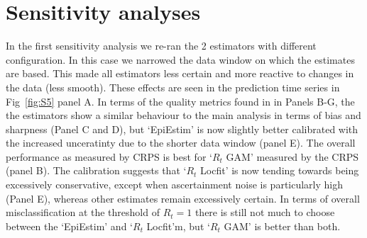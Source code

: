 \documentclass[a4paper, 12pt, twoside]{article}
\let\Oldsection\section
\renewcommand{\section}{\FloatBarrier\Oldsection}
\begin{document}
\section{Sensitivity analyses}

In the first sensitivity analysis we re-ran the 2 estimators with different configuration. In this case we narrowed the data window on which the estimates are based. This made all estimators less certain and more reactive to changes in the data (less smooth). These effects are seen in the prediction time series in Fig~\ref{fig:S5} panel A. In terms of the quality metrics found in in Panels B-G, the the estimators show a similar behaviour to the main analysis in terms of bias and sharpness (Panel C and D), but `EpiEstim' is now slightly better calibrated with the increased unceratinty due to the shorter data window (panel E). The overall performance as measured by CRPS is best for `$R_t$ GAM' measured by the CRPS (panel B). The calibration suggests that `$R_t$ Locfit' is now tending towards being excessively conservative, except when ascertainment noise is particularly high (Panel E), whereas other estimates remain excessively certain. In terms of overall misclassification at the threshold of $R_t=1$ there is still not much to choose between the `EpiEstim' and `$R_t$ Locfit'm, but `$R_t$ GAM' is better than both.
\end{document}
